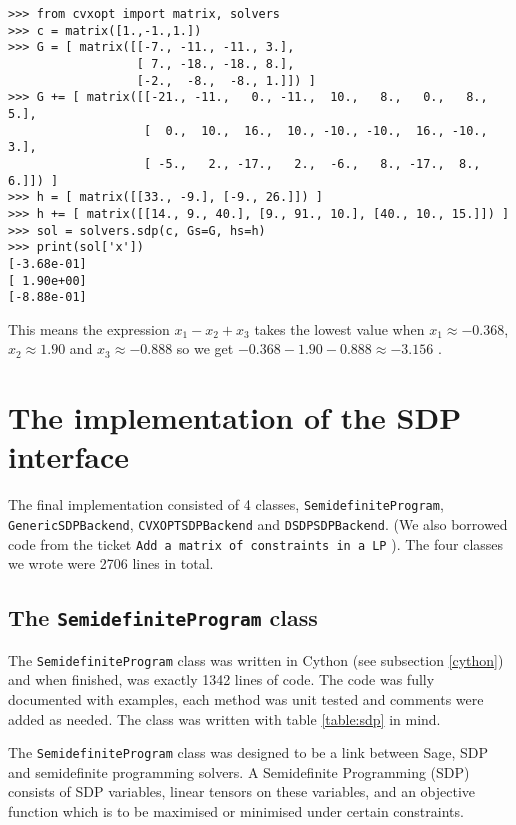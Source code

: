 \begin{verbatim}
>>> from cvxopt import matrix, solvers
>>> c = matrix([1.,-1.,1.])
>>> G = [ matrix([[-7., -11., -11., 3.],
                  [ 7., -18., -18., 8.],
                  [-2.,  -8.,  -8., 1.]]) ]
>>> G += [ matrix([[-21., -11.,   0., -11.,  10.,   8.,   0.,   8., 5.],
                   [  0.,  10.,  16.,  10., -10., -10.,  16., -10., 3.],
                   [ -5.,   2., -17.,   2.,  -6.,   8., -17.,  8., 6.]]) ]
>>> h = [ matrix([[33., -9.], [-9., 26.]]) ]
>>> h += [ matrix([[14., 9., 40.], [9., 91., 10.], [40., 10., 15.]]) ]
>>> sol = solvers.sdp(c, Gs=G, hs=h)
>>> print(sol['x'])
[-3.68e-01]
[ 1.90e+00]
[-8.88e-01]
\end{verbatim} 
This means the expression $x_1 - x_2 + x_3$ takes the lowest value when $x_1 \approx -0.368$, $x_2 \approx 1.90$ and $x_3 \approx -0.888$ so we get $-0.368 - 1.90 - 0.888 \approx -3.156$ \cite{cvxoptsdp}. 




\section{The implementation of the SDP interface}
The final implementation consisted of 4 classes, \texttt{SemidefiniteProgram}, \texttt{GenericSDPBackend}, \texttt{CVXOPTSDPBackend} and \texttt{DSDPSDPBackend}. (We also borrowed code from the ticket \texttt{Add a matrix of constraints in a LP} \cite{ticketmatrix}). The four classes we wrote were 2706 lines in total.   

\subsection{The \texttt{SemidefiniteProgram} class}
The \texttt{SemidefiniteProgram} class was written in Cython (see subsection \ref{cython}) and when finished, was exactly 1342 lines of code.  The code was fully documented with examples, each method was unit tested and comments were added as needed. The class was written with table \ref{table:sdp} in mind.

    The  \texttt{SemidefiniteProgram} class was designed to be a link between Sage, SDP and semidefinite programming solvers. A Semidefinite Programming (SDP) consists of SDP variables, linear tensors on these variables, and an objective function which is to be maximised or minimised under certain constraints. 
    
